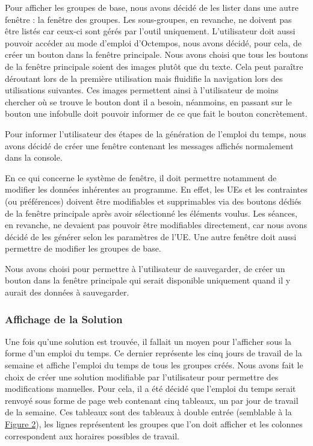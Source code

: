 \documentclass[12pt,a4paper]{article}
\begin{document}
Pour afficher les groupes de base, nous avons décidé de les lister dans une autre fenêtre : la fenêtre des groupes. Les sous-groupes, en revanche, ne doivent pas être listés car ceux-ci sont gérés par l'outil uniquement.
L'utilisateur doit aussi pouvoir accéder au mode d'emploi d'Octempos, nous avons décidé, pour cela, de créer un bouton dans la fenêtre principale. Nous avons choisi que tous les boutons de la fenêtre principale soient des images plutôt que du texte. Cela peut paraître déroutant lors de la première utilisation mais fluidifie la navigation lors des utilisations suivantes. Ces images permettent ainsi à l’utilisateur de moins chercher où se trouve le bouton dont il a besoin, néanmoins, en passant sur le bouton une infobulle doit pouvoir informer de ce que fait le bouton concrètement.

Pour informer l'utilisateur des étapes de la génération de l'emploi du temps, nous avons décidé de créer une fenêtre contenant les messages affichés normalement dans la console. 

En ce qui concerne le système de fenêtre, il doit permettre notamment de modifier les données inhérentes au programme. En effet, les UEs et les contraintes (ou préférences) doivent être modifiables et supprimables via des boutons dédiés de la fenêtre principale après avoir sélectionné les éléments voulus. Les séances, en revanche, ne devaient pas pouvoir être modifiables directement, car nous avons décidé de les générer selon les paramètres de l’UE. Une autre fenêtre doit aussi permettre de modifier les groupes de base.

Nous avons choisi pour permettre à l'utilisateur de sauvegarder, de créer un bouton dans la fenêtre principale qui serait disponible uniquement quand il y aurait des données à sauvegarder.

\subsubsection{Affichage de la Solution}

Une fois qu’une solution est trouvée, il fallait un moyen pour l'afficher sous la forme d'un emploi du temps. Ce dernier représente les cinq jours de travail de la semaine et affiche l'emploi du temps de tous les groupes créés. Nous avons fait le choix de créer une solution modifiable par l'utilisateur pour permettre des modifications manuelles.
Pour cela, il a été décidé que l’emploi du temps serait renvoyé sous forme de page web contenant cinq tableaux, un par jour de travail de la semaine. Ces tableaux sont des tableaux à double entrée (semblable à la \hyperref[exedt]{Figure 2}), les lignes représentent les groupes que l’on doit afficher et les colonnes correspondent aux horaires possibles de travail. 
\end{document}
